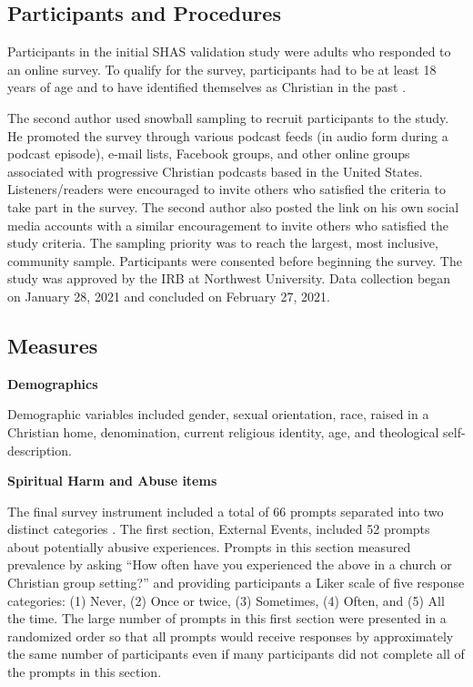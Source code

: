 \documentclass[
]{article}
\begin{document}
\hypertarget{participants-and-procedures}{%
\subsection{Participants and Procedures}\label{participants-and-procedures}}

Participants in the initial SHAS validation study were adults who responded to an online survey. To qualify for the survey, participants had to be at least 18 years of age and to have identified themselves as Christian in the past \citep{KochEdstrom2022}.

The second author used snowball sampling to recruit participants to the study. He promoted the survey through various podcast feeds (in audio form during a podcast episode), e-mail lists, Facebook groups, and other online groups associated with progressive Christian podcasts based in the United States. Listeners/readers were encouraged to invite others who satisfied the criteria to take part in the survey. The second author also posted the link on his own social media accounts with a similar encouragement to invite others who satisfied the study criteria. The sampling priority was to reach the largest, most inclusive, community sample. Participants were consented before beginning the survey. The study was approved by the IRB at Northwest University. Data collection began on January 28, 2021 and concluded on February 27, 2021.

\hypertarget{measures}{%
\subsection{Measures}\label{measures}}

\textbf{Demographics}

Demographic variables included gender, sexual orientation, race, raised in a Christian home, denomination, current religious identity, age, and theological self-description.

\textbf{Spiritual Harm and Abuse items}

The final survey instrument included a total of 66 prompts separated into two distinct categories \citep{KochEdstrom2022}. The first section, External Events, included 52 prompts about potentially abusive experiences. Prompts in this section measured prevalence by asking ``How often have you experienced the above in a church or Christian group setting?'' and providing participants a Liker scale of five response categories: (1) Never, (2) Once or twice, (3) Sometimes, (4) Often, and (5) All the time. The large number of prompts in this first section were presented in a randomized order so that all prompts would receive responses by approximately the same number of participants even if many participants did not complete all of the prompts in this section.
\end{document}
